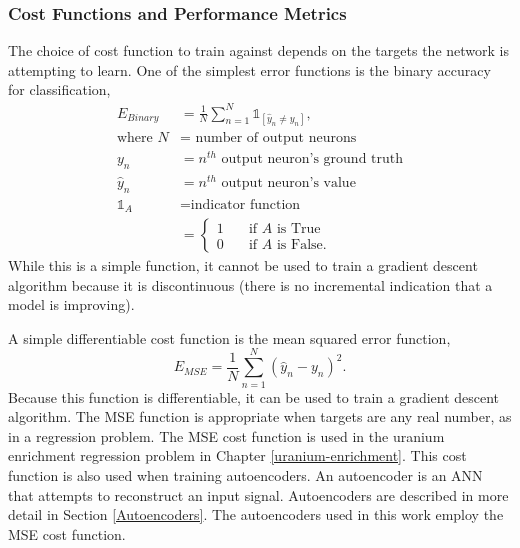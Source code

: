 \subsubsection{Cost Functions and Performance Metrics}

The choice of cost function to train against depends on the targets the network is attempting to learn. One of the simplest error functions is the binary accuracy for classification, 
%
\begin{align} \label{eq:Binary_accuracy}
E_{Binary} &= {\frac{1} N} \sum_{n=1}^N \mathds{1}_[\hat{y}_n \neq y_n ], \\
\text{where } N &= \text{ number of output neurons} \nonumber \\
y_n &= n^{th} \text{ output neuron's ground truth} \nonumber \\
\hat{y}_n &= n^{th} \text{ output neuron's value} \nonumber \\
\mathds{1}_A &= \text{indicator function} \nonumber \\
&= \nonumber
\begin{cases}
1  & \quad \text{if } A \text{ is True}\\
0  & \quad \text{if } A \text{ is False.}
\end{cases} \nonumber
\end{align}
While this is a simple function, it cannot be used to train a gradient descent algorithm because it is discontinuous (there is no incremental indication that a model is improving).

A simple differentiable cost function is the mean squared error function,
%
\begin{equation} \label{eq:MSE_error}
E_{MSE} = {\frac{1} N} \sum_{n=1}^N (\hat{y}_n - y_n)^2.
\end{equation}
%
Because this function is differentiable, it can be used to train a gradient descent algorithm. The MSE function is appropriate when targets are any real number, as in a regression problem. The MSE cost function is used in the uranium enrichment regression problem in Chapter \ref{uranium-enrichment}. This cost function is also used when training autoencoders. An autoencoder is an ANN that attempts to reconstruct an input signal. Autoencoders are described in more detail in Section \ref{Autoencoders}. The autoencoders used in this work employ the MSE cost function.

